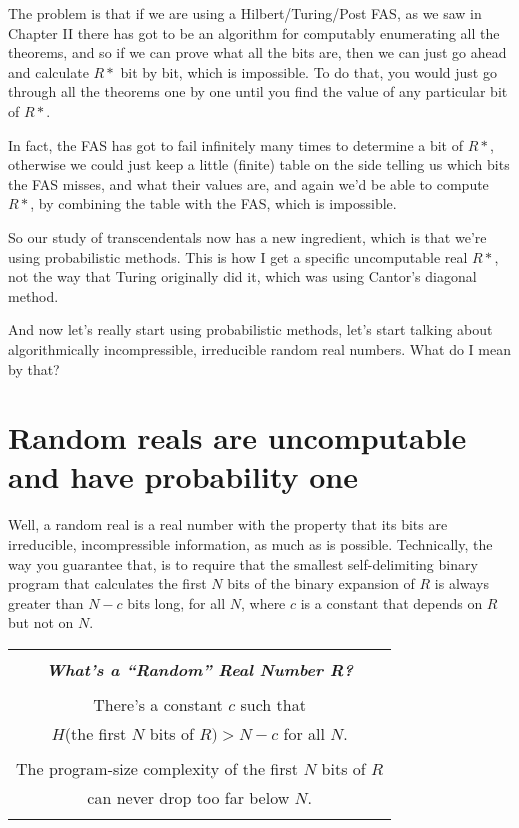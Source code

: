 \documentclass[12pt]{book}
\begin{document}
The problem is that if we are using a Hilbert/Turing/Post FAS, as we saw in Chapter II
there has got to be an algorithm for computably enumerating all the theorems, and
so if we can prove what all the bits are, then we can just go ahead and calculate $R*$
bit by bit, which is impossible.  
To do that, you would just go through all the theorems one by one until you find the value
of any particular bit of $R*$.
 
In fact, the FAS has got to fail infinitely many
times to determine a bit of $R*$, otherwise we could just keep a little (finite) table
on the side telling us which bits the FAS misses, and what their values are, and again
we'd be able to compute $R*$, by combining the table with the FAS, which is impossible.
 
So our study of transcendentals now has a new ingredient, which is that we're using
probabilistic methods.  This is how I get a specific uncomputable real $R*$, not the
way that Turing originally did it, which was using Cantor's diagonal method.
 
And now let's really start using probabilistic methods, let's start talking about
algorithmically incompressible, irreducible random real numbers.  What do I mean by that?

\section*{Random reals are uncomputable and have probability one}

Well, a random real is a real number with the property that its bits are irreducible, incompressible
information, as much as is possible.
Technically, the way you guarantee that, is to require that the smallest self-delimiting
binary program that calculates the first $N$ bits of the binary expansion of $R$ is always greater
than $N - c$ bits long, for all $N$, where $c$ is a constant that depends on $R$ but not on $N$.
 
\begin{center}
\begin{tabular}{|c|}
\hline
\\
\textbf{\emph{\large What's a ``Random'' Real Number R?}}
\\ \\
There's a constant $c$ such that 
\\
$H$(the first $N$ bits of $R) > N - c$ for all $N$.
\\ \\
The program-size complexity of the first $N$ bits of $R$ 
\\
can never drop too far below $N$.
\\
\\
\hline
\end{tabular}
\end{center}
 
\end{document}
